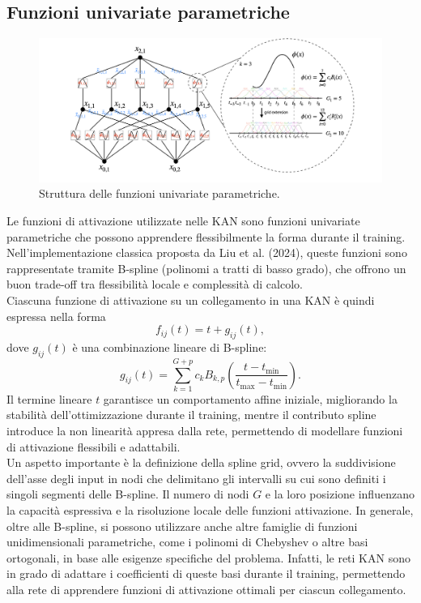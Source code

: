 \documentclass[a4paper,12pt]{report}
\begin{document}
	\subsection{Funzioni univariate parametriche}
	
	\begin{figure}[H]
		\centering
		\includegraphics[width=1.0\textwidth]{img/fup.png}
		\caption{Struttura delle funzioni univariate parametriche.}
	\end{figure}
	
	Le funzioni di attivazione utilizzate nelle KAN sono funzioni univariate parametriche che possono apprendere flessibilmente la forma durante il training. Nell’implementazione classica proposta da Liu et al. (2024), queste funzioni sono rappresentate tramite B-spline (polinomi a tratti di basso grado), che offrono un buon trade-off tra flessibilità locale e complessità di calcolo. \\
	
	Ciascuna funzione di attivazione su un collegamento in una KAN è quindi espressa nella forma
	\[
	f_{ij}(t) = t + g_{ij}(t),
	\]
	dove \(g_{ij}(t)\) è una combinazione lineare di B-spline:
	\[
	g_{ij}(t) = \sum_{k=1}^{G+p} c_k B_{k,p}\left(\frac{t - t_{\min}}{t_{\max} - t_{\min}}\right).
	\]
	Il termine lineare \(t\) garantisce un comportamento affine iniziale, migliorando la stabilità dell'ottimizzazione durante il training, mentre il contributo spline introduce la non linearità appresa dalla rete, permettendo di modellare funzioni di attivazione flessibili e adattabili. \\
	Un aspetto importante è la definizione della spline grid, ovvero la suddivisione dell'asse degli input in nodi che delimitano gli intervalli su cui sono definiti i singoli segmenti delle B-spline. Il numero di nodi \(G\) e la loro posizione influenzano la capacità espressiva e la risoluzione locale delle funzioni attivazione. In generale, oltre alle B-spline, si possono utilizzare anche altre famiglie di funzioni unidimensionali parametriche, come i polinomi di Chebyshev o altre basi ortogonali, in base alle esigenze specifiche del problema. Infatti, le reti KAN sono in grado di adattare i coefficienti di queste basi durante il training, permettendo alla rete di apprendere funzioni di attivazione ottimali per ciascun collegamento.
	
\end{document}
